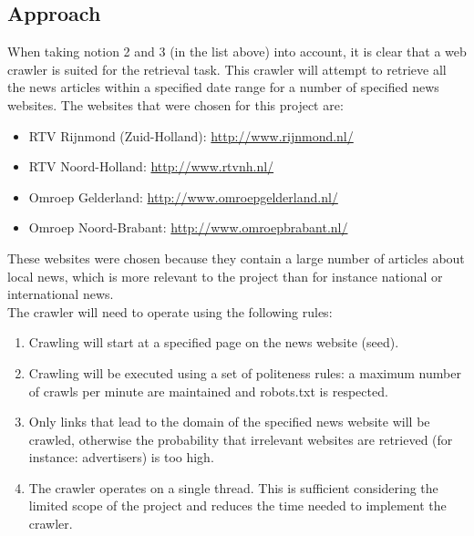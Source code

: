 \subsection*{Approach}
When taking notion 2 and 3 (in the list above) into account, it is clear that a web crawler is suited for the retrieval task. This crawler will attempt to retrieve all the news articles within a specified date range for a number of specified news websites. The websites that were chosen for this project are:
\begin{itemize}[noitemsep]
\item RTV Rijnmond (Zuid-Holland): \url{http://www.rijnmond.nl/}
\item RTV Noord-Holland: \url{http://www.rtvnh.nl/}
\item Omroep Gelderland: \url{http://www.omroepgelderland.nl/}
\item Omroep Noord-Brabant: \url{http://www.omroepbrabant.nl/}
\end{itemize}
These websites were chosen because they contain a large number of articles about local news, which is more relevant to the project than for instance national or international news.\\
The crawler will need to operate using the following rules:
\begin{enumerate}
\item Crawling will start at a specified page on the news website (seed).
\item Crawling will be executed using a set of politeness rules: a maximum number of crawls per minute are maintained and robots.txt is respected.
\item Only links that lead to the domain of the specified news website will be crawled, otherwise the probability that irrelevant websites are retrieved (for instance: advertisers) is too high.
\item The crawler operates on a single thread. This is sufficient considering the limited scope of the project and reduces the time needed to implement the crawler.
\end{enumerate}
